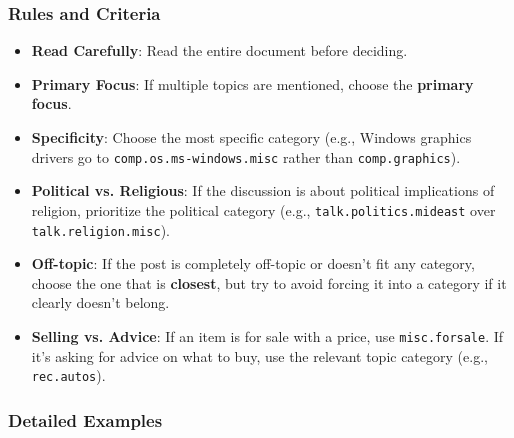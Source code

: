 \documentclass{article}
\begin{document}
\subsubsection{Rules and Criteria}
\begin{itemize}
    \item \textbf{Read Carefully}: Read the entire document before deciding.
    \item \textbf{Primary Focus}: If multiple topics are mentioned, choose the \textbf{primary focus}.
    \item \textbf{Specificity}: Choose the most specific category (e.g., Windows graphics drivers go to \texttt{comp.os.ms-windows.misc} rather than \texttt{comp.graphics}).
    \item \textbf{Political vs. Religious}: If the discussion is about political implications of religion, prioritize the political category (e.g., \texttt{talk.politics.mideast} over \texttt{talk.religion.misc}).
    \item \textbf{Off-topic}: If the post is completely off-topic or doesn't fit any category, choose the one that is \textbf{closest}, but try to avoid forcing it into a category if it clearly doesn't belong.
    \item \textbf{Selling vs. Advice}: If an item is for sale with a price, use \texttt{misc.forsale}. If it's asking for advice on what to buy, use the relevant topic category (e.g., \texttt{rec.autos}).
\end{itemize}

\subsubsection{Detailed Examples}
\end{document}
